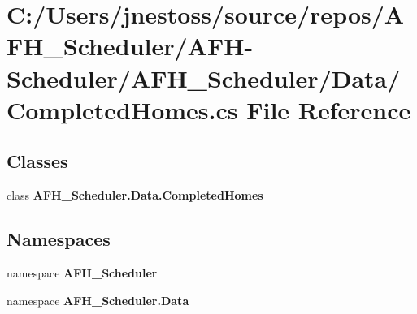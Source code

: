 \section{C\+:/\+Users/jnestoss/source/repos/\+A\+F\+H\+\_\+\+Scheduler/\+A\+F\+H-\/\+Scheduler/\+A\+F\+H\+\_\+\+Scheduler/\+Data/\+Completed\+Homes.cs File Reference}
\label{_completed_homes_8cs}
\subsection*{Classes}
\begin{DoxyCompactItemize}
\item 
class \textbf{ A\+F\+H\+\_\+\+Scheduler.\+Data.\+Completed\+Homes}
\end{DoxyCompactItemize}
\subsection*{Namespaces}
\begin{DoxyCompactItemize}
\item 
namespace \textbf{ A\+F\+H\+\_\+\+Scheduler}
\item 
namespace \textbf{ A\+F\+H\+\_\+\+Scheduler.\+Data}
\end{DoxyCompactItemize}
